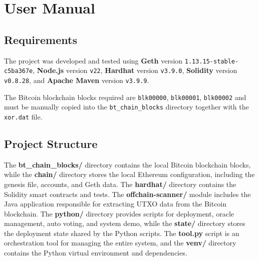 
\chapter{User Manual}
\label{Chapter3}
\setlength{\parindent}{0pt}

\section{Requirements}
The project was developed and tested using \textbf{Geth} version \texttt{1.13.15-stable-c5ba367e}, \textbf{Node.js} version \texttt{v22}, \textbf{Hardhat} version \texttt{v3.9.0}, \textbf{Solidity} version \texttt{v0.8.28}, and \textbf{Apache Maven} version \texttt{v3.9.9}.


The Bitcoin blockchain blocks required are \texttt{blk00000}, \texttt{blk00001}, \texttt{blk00002} and must be manually copied into the \texttt{bt\_chain\_blocks} directory together with the \texttt{xor.dat} file.

\section{Project Structure}

The \textbf{bt\_chain\_blocks/} directory contains the local Bitcoin blockchain blocks, while the \textbf{chain/} directory stores the local Ethereum configuration, including the genesis file, accounts, and Geth data. The \textbf{hardhat/} directory contains the Solidity smart contracts and tests. The \textbf{offchain-scanner/} module includes the Java application responsible for extracting UTXO data from the Bitcoin blockchain. The \textbf{python/} directory provides scripts for deployment, oracle management, auto voting, and system demo, while the \textbf{state/} directory stores the deployment state shared by the Python scripts. The \textbf{tool.py} script is an orchestration tool for managing the entire system, and the \textbf{venv/} directory contains the Python virtual environment and dependencies.

